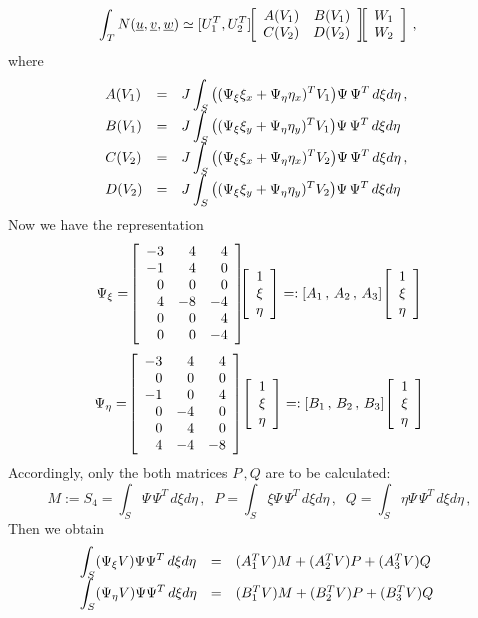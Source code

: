 \documentclass[12pt,a4paper,USenglish,twoside]{book}
\begin{document}
\par\vspace{1ex}
\[
\int_TN(\u,\v,\w) \simeq
[U_1^T,U^T_2]\, \ba{[}{rr} A(V_1) & B(V_1)\\ C(V_2) & D(V_2)\ea{]}
\ba{[}{r}W_1\\ W_2\ea{]}\,,\;
\]
where
\begin{equation}\label{e2}
\ba{.}{lll}
A(V_1) &=& \dis J\int_S\big((\Psi_{\xi}\xi_x + \Psi_{\eta}\eta_x)^TV_1\big)
\Psi\,\Psi^T\, d\xi d\eta\,, \\[1ex]
B(V_1) &=& \dis J\int_S\big((\Psi_{\xi}\xi_y + \Psi_{\eta}\eta_y)^TV_1\big)
\Psi\,\Psi^T\, d\xi d\eta\\[1ex]
C(V_2) &=& \dis J\int_S\big((\Psi_{\xi}\xi_x + \Psi_{\eta}\eta_x)^TV_2\big)
\Psi\,\Psi^T\, d\xi d\eta \,,\\[1ex]
D(V_2) &=& \dis J\int_S\big((\Psi_{\xi}\xi_y + \Psi_{\eta}\eta_y)^TV_2\big)
\Psi\,\Psi^T\, d\xi d\eta
\ea{.}
\end{equation}
Now we have the representation
\[
\Psi_{\xi} = \ \ba{[}{rrr}
 -3 & 4 & 4\\
 -1 & 4 & 0\\
 0 & 0 & 0\\
 4 & -8 & -4\\
 0 & 0 & 4\\
0 & 0 & -4\ea{]}
\ba{[}{r}1\\ \xi \\ \eta\ea{]}
 =: [A_1\,,\, A_2\,,\, A_3]\ \ba{[}{r}1\\ \xi \\ \eta\ea{]}
\]
\[
\Psi_{\eta} = \ \ba{[}{rrr}
 -3 & 4 & 4\\
  0 & 0 & 0\\
 -1 & 0 & 4\\
 0 & -4 & 0\\
 0 & 4 & 0\\
 4 & -4 & -8\ea{]}\
\ba{[}{r}1\\ \xi \\ \eta\ea{]}
 =: [B_1\,,\, B_2\,,\, B_3]\ \ba{[}{r}1\\ \xi \\ \eta\ea{]}
\]
Accordingly, only the both matrices $P\,,Q$ are to be calculated:
\[
M := S_4 = \int_S \Psi\,\Psi^T\, d\xi d\eta\,, \;\;
P = \int_S\xi \Psi\,\Psi^T\, d\xi d\eta\,, \;\;
Q = \int_S\eta \Psi\,\Psi^T\, d\xi d\eta\,,
\]
Then we obtain
\[
\ba{.}{lll}
\dis \int_S(\Psi_{\xi}V)\Psi\Psi^T \,d\xi d\eta
&=& (A_1^TV)M + (A_2^TV)P + (A_3^TV)Q\\[1ex]
\dis \int_S(\Psi_{\eta}V)\Psi\Psi^T \,d\xi d\eta
&=& (B_1^TV)M + (B_2^TV)P + (B_3^TV)Q\\[1ex]
\ea{.}
\]
\end{document}
